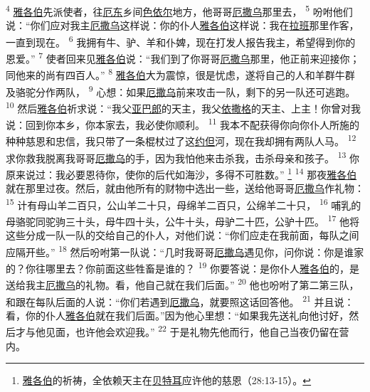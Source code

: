 \textsuperscript{4}
\uline{雅各伯}先派使者，往\uline{厄东}乡间\uline{色依尔}地方，他哥哥\uline{厄撒乌}那里去，
\textsuperscript{5}
吩咐他们说：“你们应对我主\uline{厄撒乌}这样说：你的仆人\uline{雅各伯}这样说：我在\uline{拉班}那里作客，一直到现在。
\textsuperscript{6}
我拥有牛、驴、羊和仆婢，现在打发人报告我主，希望得到你的恩爱。”
\textsuperscript{7}
使者回来见\uline{雅各伯}说：“我们到了你哥哥\uline{厄撒乌}那里，他正前来迎接你；同他来的尚有四百人。”
\textsuperscript{8}
\uline{雅各伯}大为震惊，很是忧虑，遂将自己的人和羊群牛群及骆驼分作两队，
\textsuperscript{9}
心想：如果\uline{厄撒乌}前来攻击一队，剩下的另一队还可逃跑。
\textsuperscript{10}
然后\uline{雅各伯}祈求说：“我父\uline{亚巴郎}的天主，我父\uline{依撒格}的天主、上主！你曾对我说：回到你本乡，你本家去，我必使你顺利。
\textsuperscript{11}
我本不配获得你向你仆人所施的种种慈恩和忠信，我只带了一条棍杖过了这\uline{约但}河，现在我却拥有两队人马。
\textsuperscript{12}
求你救我脱离我哥哥\uline{厄撒乌}的手，因为我怕他来击杀我，击杀母亲和孩子。
\textsuperscript{13}
你原来说过：我必要恩待你，使你的后代如海沙，多得不可胜数。”
\footnote{\uline{雅各伯}的祈祷，全依赖天主在\uline{贝特耳}应许他的慈恩（28:13-15）。}
\textsuperscript{14}
那夜\uline{雅各伯}就在那里过夜。然后，就由他所有的财物中选出一些，送给他哥哥\uline{厄撒乌}作礼物：
\textsuperscript{15}
计有母山羊二百只，公山羊二十只，母绵羊二百只，公绵羊二十只，
\textsuperscript{16}
哺乳的母骆驼同驼驹三十头，母牛四十头，公牛十头，母驴二十匹，公驴十匹。
\textsuperscript{17}
他将这些分成一队一队的交给自己的仆人，对他们说：“你们应走在我前面，每队之间应隔开些。”
\textsuperscript{18}
然后吩咐第一队说：“几时我哥哥\uline{厄撒乌}遇见你，问你说：你是谁家的？你往哪里去？你前面这些牲畜是谁的？
\textsuperscript{19}
你要答说：是你仆人\uline{雅各伯}的，是送给我主\uline{厄撒乌}的礼物。看，他自己就在我们后面。”
\textsuperscript{20}
他也吩咐了第二第三队，和跟在每队后面的人说：“你们若遇到\uline{厄撒乌}，就要照这话回答他。
\textsuperscript{21}
并且说：看，你的仆人\uline{雅各伯}就在我们后面。”因为他心里想：“如果我先送礼向他讨好，然后才与他见面，也许他会欢迎我。”
\textsuperscript{22}
于是礼物先他而行，他自己当夜仍留在营内。

